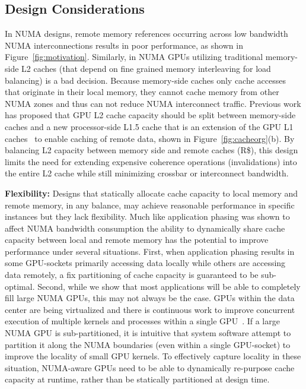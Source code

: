 \subsection{Design Considerations}
In NUMA designs, remote memory references occurring across low bandwidth NUMA 
interconnections results in poor performance, as shown in 
Figure~\ref{fig:motivation}. Similarly, in NUMA GPUs utilizing
traditional memory-side L2 caches (that depend on fine grained memory 
interleaving for load balancing) is a bad decision. Because memory-side caches only
cache accesses that originate in their local memory, they cannot
cache memory from other NUMA zones and thus can not reduce NUMA interconnect traffic.  
Previous work has proposed that GPU L2 cache capacity should be split between 
memory-side caches and a new processor-side L1.5 cache that is an extension 
of the GPU L1 caches~\cite{Arunkumar2017} to enable caching of remote data, shown
in Figure~\ref{fig:cacheorg}(b). By balancing L2 capacity between memory side 
and remote caches (R\$), this design limits the need for extending expensive coherence
operations (invalidations) into the entire L2 cache while still 
minimizing crossbar or interconnect bandwidth.

\textbf{Flexibility:} Designs that statically allocate cache capacity to local memory and remote memory, 
in any balance, may achieve reasonable performance in specific instances 
but they lack flexibility. Much like application phasing was shown to affect 
NUMA bandwidth consumption the ability to dynamically share cache capacity between local and 
remote memory has the potential to improve performance under several 
situations. First, when application phasing results in some GPU-sockets
primarily accessing data locally while others are accessing data remotely,
a fix partitioning of cache capacity is guaranteed to be sub-optimal.
Second, while 
we show that most applications will be able to completely fill large 
NUMA GPUs, this may not always be the case. GPUs within the data center are 
being virtualized and there is continuous work to improve concurrent execution 
of multiple kernels and processes within a single GPU~\cite{park2015chimera, lin2016enabling, puthoor2016implementing, HSATASKMODEL}. If a large NUMA GPU is sub-partitioned, it is intuitive 
that system software attempt to partition it along the NUMA boundaries (even within
a single GPU-socket) to improve the locality of small GPU kernels.
To effectively  capture locality in these situation, NUMA-aware GPUs need to be able to 
dynamically re-purpose cache capacity at runtime, rather than be statically partitioned at design time. 

